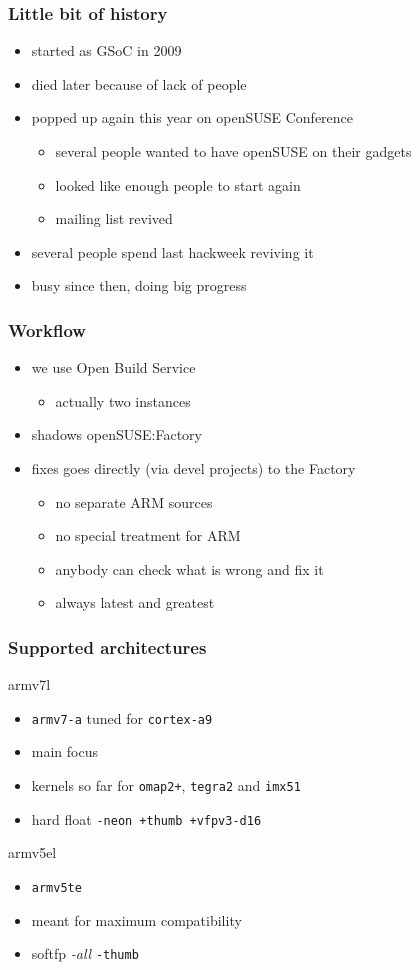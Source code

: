 \documentclass{beamer}
\begin{document}

\begin{frame}[t]
\frametitle{Little bit of history}
\begin{itemize}
   \item started as GSoC in 2009
   \item died later because of lack of people
   \item popped up again this year on openSUSE Conference
   \begin{itemize}
   	\item several people wanted to have openSUSE on their gadgets
	\item looked like enough people to start again
	\item mailing list revived
   \end{itemize}
   \item several people spend last hackweek reviving it
   \item busy since then, doing big progress
\end{itemize}
\end{frame}

\begin{frame}[t]
\frametitle{Workflow}
\begin{itemize}
   \item we use Open Build Service
   \begin{itemize}
   	\item actually two instances
   \end{itemize}
   \item shadows openSUSE:Factory
   \item fixes goes directly (via devel projects) to the Factory
   \begin{itemize}
   	\item no separate ARM sources
	\item no special treatment for ARM
   	\item anybody can check what is wrong and fix it
	\item always latest and greatest
   \end{itemize}
\end{itemize}
\end{frame}

\begin{frame}[t]
\frametitle{Supported architectures}
armv7l
\begin{itemize}
\item \texttt{armv7-a} tuned for \texttt{cortex-a9}
\item main focus
\item kernels so far for \texttt{omap2+}, \texttt{tegra2} and \texttt{imx51}
\item hard float \texttt{-neon +thumb +vfpv3-d16}
\end{itemize}
armv5el
\begin{itemize}
\item \texttt{armv5te}
\item meant for maximum compatibility
\item softfp \textit{-all} \texttt{-thumb}
\end{itemize}
\end{frame}
\end{document}
